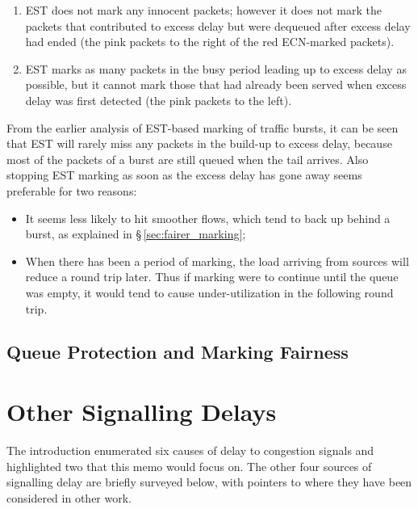 \begin{enumerate}[nosep, label=Q\arabic*.]
	\item EST does not mark any innocent packets; however it does not mark the packets that contributed to excess delay but were dequeued after excess delay had ended (the pink packets to the right of the red ECN-marked packets). 
	\item EST marks as many packets in the busy period leading up to excess delay as possible, but it cannot mark those that had already been served when excess delay was first detected (the pink packets to the left).
\end{enumerate}
From the earlier analysis of EST-based marking of traffic bursts, it can be seen that EST will rarely miss any packets in the build-up to excess delay, because most of the packets of a burst are still queued when the tail arrives. Also stopping EST marking as soon as the excess delay has gone away seems preferable for two reasons:
\begin{itemize}
	\item It seems less likely to hit smoother flows, which tend to back up behind a burst, as explained in \S\,\ref{sec:fairer_marking};
	\item When there has been a period of marking, the load arriving from sources will reduce a round trip later. Thus if marking were to continue until the queue was empty, it would tend to cause under-utilization in the following round trip.
\end{itemize}

\subsection{Queue Protection and Marking Fairness}\label{sec:qprot_marking_fairness}


\section{Other Signalling Delays}\label{sec:other_delays}

The introduction enumerated six causes of delay to congestion signals and highlighted two that this memo would focus on. The other four sources of signalling delay are briefly surveyed below, with pointers to where they have been considered in other work.

